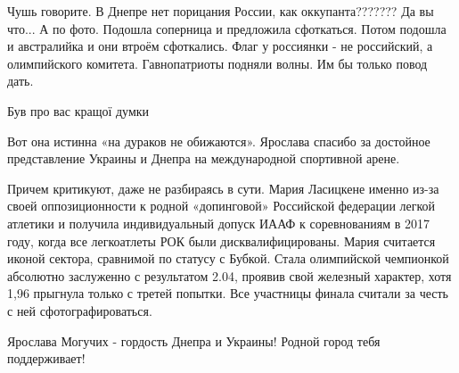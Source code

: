 \begin{itemize}
\begin{itemize}
 
Чушь говорите. В Днепре нет порицания России, как оккупанта??????? Да вы что...
А по фото. Подошла соперница и предложила сфоткаться. Потом подошла и австралийка и они втроём сфоткались.
Флаг у россиянки - не российский, а олимпийского комитета.
Гавнопатриоты подняли волны. Им бы только повод дать.
\end{itemize}

 
Був про вас кращої думки

 
Вот она истинна «на дураков не обижаются».
Ярослава спасибо за достойное представление Украины и Днепра на международной спортивной арене.

 

Причем критикуют, даже не разбираясь в сути. Мария Ласицкене именно из-за своей
оппозиционности к родной «допинговой» Российской федерации легкой атлетики и
получила индивидуальный допуск ИААФ к соревнованиям в 2017 году, когда все
легкоатлеты РОК были дисквалифицированы. Мария считается иконой сектора,
сравнимой по статусу с Бубкой. Стала олимпийской чемпионкой абсолютно
заслуженно с результатом 2.04, проявив свой железный характер, хотя 1,96
прыгнула только с третей попытки. Все участницы финала считали за честь с ней
сфотографироваться.

Ярослава Могучих - гордость Днепра и Украины! Родной город тебя поддерживает!


\end{itemize}
